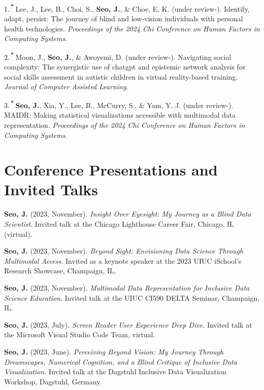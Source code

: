 \documentclass[11pt,a4paper,]{awesome-cv}
\begin{document}
\hypertarget{bibliography}{}
\leavevmode\hypertarget{ref-lee2024identify}{}%
1.\textsuperscript{\emph{\textbf{*}}} Lee, J., Lee, B., Choi, S.,
\textbf{Seo, J.}, \& Choe, E. K. (under review-). Identify, adapt,
persist: The journey of blind and low-vision individuals with personal
health technologies. \emph{Proceedings of the 2024 Chi Conference on
Human Factors in Computing Systems}.

\leavevmode\hypertarget{ref-moon2023navigating}{}%
2.\textsuperscript{\emph{\textbf{*}}} Moon, J., \textbf{Seo, J.}, \&
Awoyemi, D. (under review-). Navigating social complexity: The
synergistic use of chatgpt and epistemic network analysis for social
skills assessment in autistic children in virtual reality-based
training. \emph{Journal of Computer Assisted Learning}.

\leavevmode\hypertarget{ref-seo2024maidr}{}%
3.\textsuperscript{\emph{\textbf{*}}} \textbf{Seo, J.}, Xia, Y., Lee,
B., McCurry, S., \& Yam, Y. J. (under review-). MAIDR: Making
statistical visualizations accessible with multimodal data
representation. \emph{Proceedings of the 2024 Chi Conference on Human
Factors in Computing Systems}.

\hypertarget{conference-presentations-and-invited-talks}{%
\section{Conference Presentations and Invited
Talks}\label{conference-presentations-and-invited-talks}}

\textbf{Seo, J.} (2023, November). \emph{Insight Over Eyesight: My
Journey as a Blind Data Scientist}. Invited talk at the Chicago
Lighthouse Career Fair, Chicago, IL (virtual).

\textbf{Seo, J.} (2023, November). \emph{Beyond Sight: Envisioning Data
Science Through Multimodal Access}. Invited as a keynote speaker at the
2023 UIUC iSchool's Research Showcase, Champaign, IL.

\textbf{Seo, J.} (2023, November). \emph{Multimodal Data Representation
for Inclusive Data Science Education}. Invited talk at the UIUC CI590
DELTA Seminar, Champaign, IL.

\textbf{Seo, J.} (2023, July). \emph{Screen Reader User Experience Deep
Dive}. Invited talk at the Microsoft Visual Studio Code Team, virtual.

\textbf{Seo, J.} (2023, June). \emph{Perceiving Beyond Vision: My
Journey Through Dreamscapes, Numerical Cognition, and a Blind Critique
of Inclusive Data Visualization}. Invited talk at the Dagstuhl Inclusive
Data Visualization Workshop, Dagstuhl, Germany.
\end{document}

